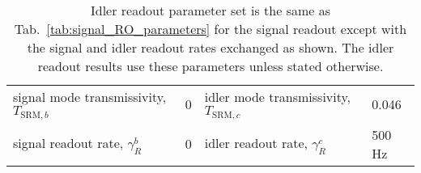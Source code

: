 \begin{table}
\centering
\begin{tabular}{@{}ll|ll@{}}
\toprule
signal mode transmissivity, $T_{\text{SRM},b}$ & 0 & idler mode transmissivity, $T_{\text{SRM},c}$ & 0.046 \\ 
signal readout rate, $\gamma^b_R$ & 0 & idler readout rate, $\gamma^c_R$ & 500 Hz \\ \bottomrule
\end{tabular}
\caption{Idler readout parameter set is the same as Tab.~\ref{tab:signal_RO_parameters} for the signal readout except with the signal and idler readout rates exchanged as shown. The idler readout results use these parameters unless stated otherwise.}
\label{tab:idler_RO_parameters}
\end{table}

